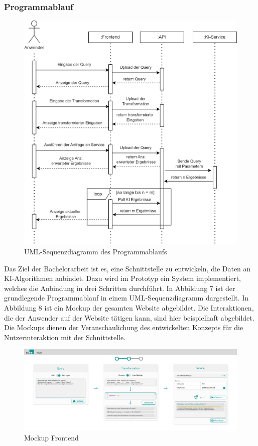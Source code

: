 \subsubsection{Programmablauf}
\begin{figure}[H]
  \centering
    \includegraphics[width = 15cm]{bilder/ArchitekturSequenz}
    \caption{UML-Sequenzdiagramm des Programmablaufs}
\end{figure}

Das Ziel der Bachelorarbeit ist es, eine Schnittstelle zu entwickeln, die Daten an KI-Algorithmen anbindet. Dazu wird im Prototyp ein System implementiert, welches die Anbindung in drei Schritten durchführt. In Abbildung 7 ist der grundlegende Programmablauf in einem UML-Sequenzdiagramm dargestellt. In Abbildung 8 ist ein Mockup der gesamten Website abgebildet. Die Interaktionen, die der Anwender auf der Website tätigen kann, sind hier beispielhaft abgebildet. Die Mockups dienen der Veranschaulichung des entwickelten Konzepts für die Nutzerinteraktion mit der Schnittstelle. 

\begin{figure}[H]
  \centering
    \includegraphics[width = 15cm]{bilder/mockup}
    \caption{Mockup Frontend}
\end{figure}

